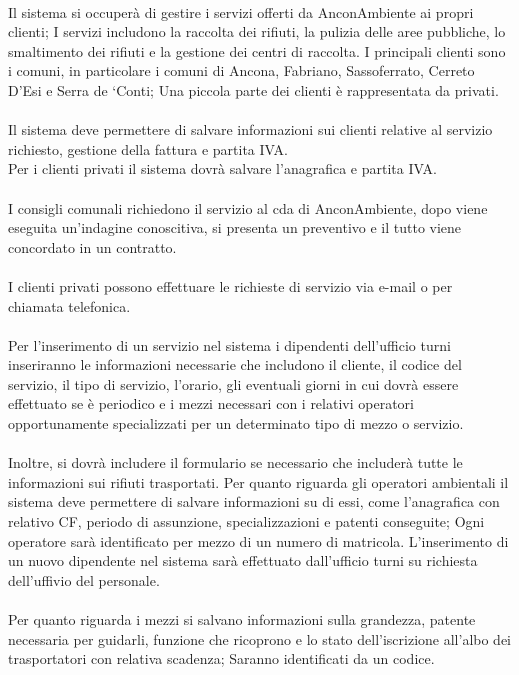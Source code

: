 \documentclass[green, fancy, 11pt]{elegantbook}
\begin{document}
\\
Il sistema si occuperà di gestire i servizi offerti da AnconAmbiente ai propri clienti; I servizi includono la raccolta dei rifiuti, la pulizia delle aree pubbliche, lo smaltimento dei rifiuti e la gestione dei centri di raccolta.
I principali clienti sono i comuni, in particolare i comuni di Ancona, Fabriano, Sassoferrato, Cerreto D’Esi e Serra de ‘Conti; Una piccola parte dei clienti è rappresentata da privati.\\
\\
Il sistema deve permettere di salvare informazioni sui clienti relative al servizio richiesto, gestione della fattura e partita IVA.\\
Per i clienti privati il sistema dovrà salvare l’anagrafica e partita IVA.\\
\\
I consigli comunali richiedono il servizio al cda di AnconAmbiente, dopo viene eseguita un’indagine conoscitiva, si presenta un preventivo e il tutto viene concordato in un contratto.\\
\\
I clienti privati possono effettuare le richieste di servizio via e-mail o per chiamata telefonica.\\
\\
Per l’inserimento di un servizio nel sistema i dipendenti dell’ufficio turni inseriranno le informazioni necessarie che includono il cliente, il codice del servizio, il tipo di servizio, l’orario, gli eventuali giorni in cui dovrà essere effettuato se è periodico e i mezzi necessari con i relativi operatori opportunamente specializzati per un determinato tipo di mezzo o servizio.\\
\\
Inoltre, si dovrà includere il formulario se necessario che includerà tutte le informazioni sui rifiuti trasportati.
Per quanto riguarda gli operatori ambientali il sistema deve permettere di salvare informazioni su di essi, come l’anagrafica con relativo CF, periodo di assunzione, specializzazioni e patenti conseguite; Ogni operatore sarà identificato per mezzo di un numero di matricola.
L’inserimento di un nuovo dipendente nel sistema sarà effettuato dall’ufficio turni su richiesta dell’uffivio del personale.\\
\\
Per quanto riguarda i mezzi si salvano informazioni sulla grandezza, patente necessaria per guidarli, funzione che ricoprono e lo stato dell’iscrizione all’albo dei trasportatori con relativa scadenza; Saranno identificati da un codice.\\
\end{document}
